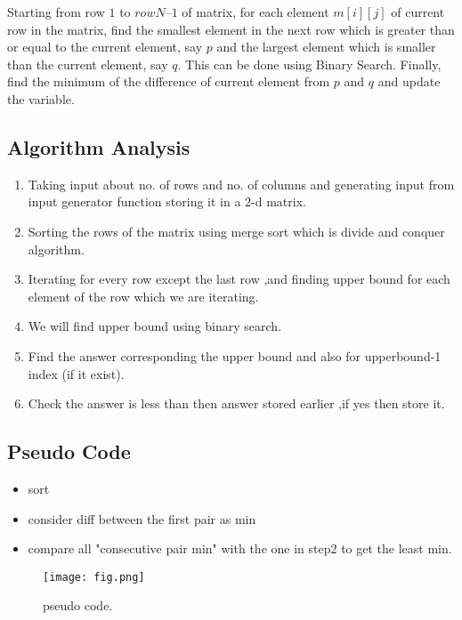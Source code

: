 \documentclass[conference]{IEEEtran}
\begin{document}
 Starting from row $1$ to $row N – 1$ of matrix, for each element $m[i][j]$ of current row in the matrix, find the smallest element in the next row which is greater than or equal to the current element, say $p$ and the largest element which is smaller than the current element, say $q$. This can be done using Binary Search. Finally, find the minimum of the difference of current element from $p$ and $q$ and update the variable.


\subsection{Algorithm Analysis}
\begin{enumerate}
\item Taking input about no. of rows and no. of columns and generating input from input generator function storing it in a 2-d matrix.\\

\item Sorting the rows of the matrix using merge sort which is divide and conquer algorithm.\\

\item Iterating for every row except the last row ,and finding upper bound for each element of the row which we are iterating.\\

\item We will find upper bound using binary search.\\

\item Find the answer corresponding the upper bound and also for upperbound-1 index (if it exist).\\

\item Check the answer is less than then answer stored earlier ,if yes then store it.
\end{enumerate}



\subsection{Pseudo Code}\label{AA}

\begin{itemize}
\item sort


\item consider diff between the first pair as min

 
\item compare all "consecutive pair min" with the one in step2 to get the least min.

\end{itemize}
\begin{figure}[htbp]
\centerline{\texttt{[image: fig.png]}}
\caption{pseudo code.}
\label{fig}
\end{figure}
\end{document}

